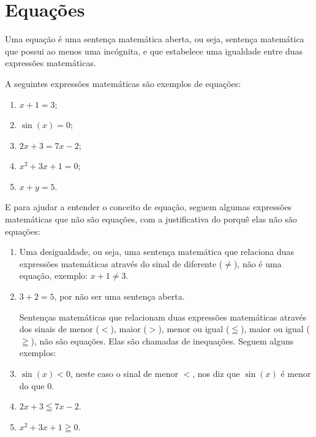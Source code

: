 \chapter{Equações}

\colorbox{azul}{
 \begin{minipage}{0.9\linewidth}
 \begin{center}
   Uma equação é uma sentença matemática aberta, ou seja, sentença matemática que possui ao menos uma incógnita, e que estabelece uma igualdade entre duas expressões matemáticas.
 \end{center}
 \end{minipage}}

 \vskip0.3cm

 \begin{exem}
 A seguintes expressões matemáticas são exemplos de equações:

\begin{enumerate}[(1)]
 \item $x+1=3$;
 \item $\sin(x)=0$;
 \item $2x+3=7x-2$;
 \item $x^2+3x+1=0$;
 \item $x+y= 5$.
\end{enumerate}
\end{exem}

 E para ajudar a entender o conceito de equação, seguem algumas expressões matemáticas que não são equações, com a justificativa do porquê elas não são equações:
\begin{exem}
\begin{enumerate}[(1)]
 \item Uma desigualdade, ou seja, uma sentença matemática que relaciona duas expressões matemáticas através do sinal de diferente ($\neq$), não é uma equação, exemplo: $x+1 \neq 3$.

 \item $3 + 2 = 5$, por não ser uma sentença aberta.

 Sentenças matemáticas que relacionam duas expressões matemáticas através dos sinais de menor ($<$), maior ($>$), menor ou igual ($\leqq$), maior ou igual ($\geqq$), não são equações. Elas são chamadas de inequações. Seguem alguns exemplos:

 \item $\sin(x) < 0$, neste caso o sinal de menor $<$, nos diz que $\sin(x)$ é menor do que $0$.
 \item $2x+3 \leqq 7x-2$.
 \item $x^2+3x+1 \geqq 0$.
\end{enumerate}
\end{exem}




